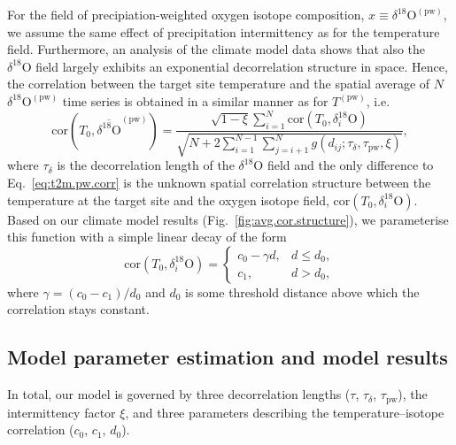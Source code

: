 \documentclass[cp, manuscript]{copernicus}
\begin{document}
For the field of precipiation-weighted oxygen isotope composition, $x \equiv
\delta^{18}\mathrm{O}^{\mathrm{(pw)}}$, we assume the same effect of
precipitation intermittency as for the temperature field. Furthermore, an
analysis of the climate model data shows that also the $\delta^{18}\mathrm{O}$
field largely exhibits an exponential decorrelation structure in space. Hence,
the correlation between the target site temperature and the spatial average of
$N$ $\delta^{18}\mathrm{O}^{\mathrm{(pw)}}$ time series is obtained in a similar
manner as for $T^{\mathrm{(pw)}}$, i.e.
%
\begin{equation}
\label{eq:oxy.pw.corr}
\mathrm{cor}\left(T_0,
  \overline{\delta^{18}\mathrm{O}}^{\mathrm{(pw)}}\right)=
\frac
{\sqrt{1-\xi}\sum_{i=1}^{N}\mathrm{cor}\left(T_0,\delta_i^{18}\mathrm{O}\right)}
{\sqrt{N + 2\sum_{i=1}^{N-1}\sum_{j=i+1}^{N}
  g(d_{ij}; \tau_{\delta}, \tau_{\mathrm{pw}}, \xi)}},
\end{equation}
%
where $\tau_{\delta}$ is the decorrelation length of the $\delta^{18}\mathrm{O}$
field and the only difference to Eq.~\eqref{eq:t2m.pw.corr} is the unknown
spatial correlation structure between the temperature at the target site and the
oxygen isotope field, $\mathrm{cor}\left(T_0,\delta_i^{18}\mathrm{O}\right)$.
Based on our climate model results (Fig.~\ref{fig:avg.cor.structure}), we
parameterise this function with a simple linear decay of the form
%
\begin{equation}
\label{eq:t2m.oxy.corr}
\mathrm{cor}\left(T_0,\delta_i^{18}\mathrm{O}\right)=
\begin{cases}
  c_0 - \gamma d, & d \le d_0,\\
  c_1, & d > d_0,
\end{cases}
\end{equation}
%
where $\gamma=(c_0-c_1)/d_0$ and $d_0$ is some threshold distance above which
the correlation stays constant.

\subsection{Model parameter estimation and model results}
\label{app:concept.model.estimation}

In total, our model is governed by three decorrelation lengths ($\tau$,
$\tau_{\delta}$, $\tau_{\mathrm{pw}}$), the intermittency factor $\xi$, and
three parameters describing the temperature--isotope correlation ($c_0$, $c_1$,
$d_0$).
\end{document}
